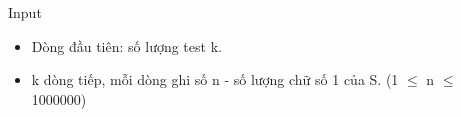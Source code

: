 Input
\begin{itemize}
	\item Dòng đầu tiên: số lượng test k.
	\item k dòng tiếp, mỗi dòng ghi số n - số lượng chữ số 1 của S. (1  $\le$  n  $\le$  1000000)
\end{itemize}